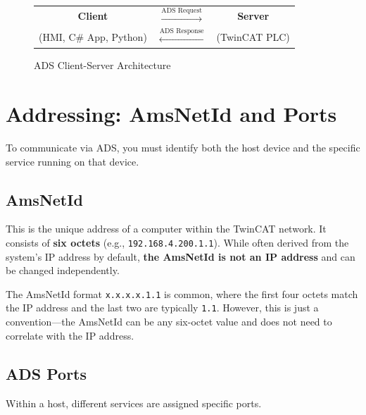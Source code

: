 \documentclass[11pt,a4paper]{article}
\begin{document}
\begin{figure}[h]
\centering
\begin{tabular}{|c|c|c|}
\hline
\textbf{Client} & $\xrightarrow{\text{ADS Request}}$ & \textbf{Server} \\
(HMI, C\# App, Python) & $\xleftarrow{\text{ADS Response}}$ & (TwinCAT PLC) \\
\hline
\end{tabular}
\caption{ADS Client-Server Architecture}
\end{figure}

\section{Addressing: AmsNetId and Ports}

To communicate via ADS, you must identify both the host device and the specific service running on that device.

\subsection{AmsNetId}

This is the unique address of a computer within the TwinCAT network. It consists of \textbf{six octets} (e.g., \texttt{192.168.4.200.1.1}). While often derived from the system's IP address by default, \textbf{the AmsNetId is not an IP address} and can be changed independently.

\begin{notebox}
The AmsNetId format \texttt{x.x.x.x.1.1} is common, where the first four octets match the IP address and the last two are typically \texttt{1.1}. However, this is just a convention---the AmsNetId can be any six-octet value and does not need to correlate with the IP address.
\end{notebox}

\subsection{ADS Ports}

Within a host, different services are assigned specific ports.
\end{document}

